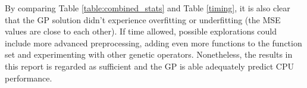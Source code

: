 \documentclass{article}
\begin{document}
By comparing Table \ref{table:combined_stats} and Table \ref{timing}, it is also clear that the GP solution didn't experience overfitting or underfitting (the MSE values are close to each other). If time allowed, possible explorations could include more advanced preprocessing, adding even more functions to the function set and experimenting with other genetic operators. Nonetheless, the results in this report is regarded as sufficient and the GP is able adequately predict CPU performance.



\end{document}
